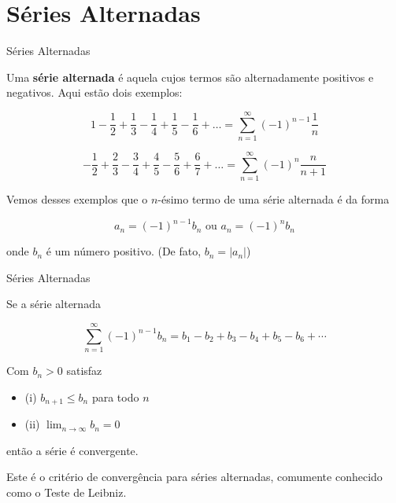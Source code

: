 \documentclass[brazil]{beamer}
\begin{document}
	\section{Séries Alternadas}
	\begin{frame}
		\tableofcontents[currentsection]
	\end{frame}
	
	\begin{frame}{Séries Alternadas}
		\begin{definition}[3]
			Uma \textbf{série alternada} é aquela cujos termos são alternadamente positivos e negativos. Aqui
			estão dois exemplos:
			
			$$
			1 - \frac{1}{2} + \frac{1}{3} - \frac{1}{4} + \frac{1}{5} - \frac{1}{6} + \dots = \displaystyle\sum_{n=1}^{\infty}(-1)^{n - 1}\frac{1}{n}
			$$
			
			$$
			- \frac{1}{2} +  \frac{2}{3} - \frac{3}{4} + \frac{4}{5} - \frac{5}{6} + \frac{6}{7} + \dots = \displaystyle\sum_{n=1}^{\infty}(-1)^{n}\frac{n}{n + 1}
			$$
			
			Vemos desses exemplos que o $n$-ésimo termo de uma série alternada é da forma
			
			$$a_n = (-1)^{n - 1}b_n \text{ ou } a_n = (-1)^{n}b_n$$
			
			onde $b_n$ é um número positivo. (De fato, $b_n = |a_n|$)
			
		\end{definition}
		
	\end{frame}
	
	\begin{frame}{Séries Alternadas}
		
		\begin{theorem}[4]
			\justifying
			Se a série alternada
			
			$$\displaystyle\sum_{n=1}^{\infty}(-1)^{n - 1} b_n = b_1 - b_2 + b_3 - b_4 + b_5 - b_6 + \cdots  $$
			
			Com $b_n > 0$ satisfaz
			
			\begin{itemize}[label=, left=115pt]
				\item (i) $b_{n + 1} \leq b_n$ para todo $n$
				\item (ii) $\displaystyle\lim_{n \to \infty} b_n = 0$
			\end{itemize}
			então a série é convergente.
			
		\end{theorem}
		\small{
			Este é o critério de convergência para séries alternadas, comumente conhecido como o Teste de Leibniz.}
		
	\end{frame}
	
\end{document}
